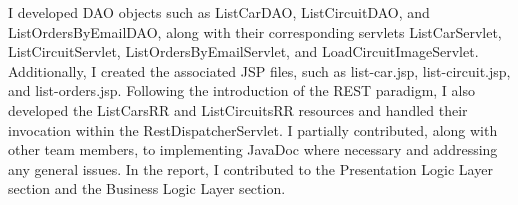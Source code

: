 \begin{description}
								I developed DAO objects such as ListCarDAO, ListCircuitDAO, and ListOrdersByEmailDAO, along with their corresponding servlets ListCarServlet, ListCircuitServlet, ListOrdersByEmailServlet, and LoadCircuitImageServlet.
	Additionally, I created the associated JSP files, such as list-car.jsp, list-circuit.jsp, and list-orders.jsp. Following the introduction of the REST paradigm, I also developed the ListCarsRR and ListCircuitsRR resources and handled their invocation within the RestDispatcherServlet.
	I partially contributed, along with other team members, to implementing JavaDoc where necessary and addressing any general issues.
	In the report, I contributed to the Presentation Logic Layer section and the Business Logic Layer section.







\end{description}

